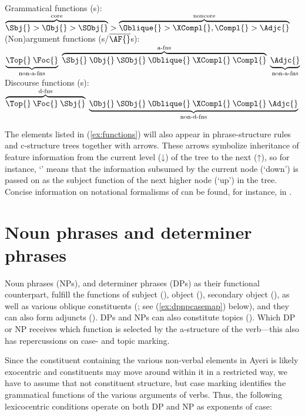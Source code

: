\pex\label{ex:functions}
\a\label{ex:gfs} Grammatical functions (\GF{}s):\\
	$\overbrace{\Sbj{} > \Obj{} > \SObj{}}^{\text{core}} > 
	\overbrace{\Oblique{} > \XCompl{}, \Compl{} > \Adjc{}}^{\text{noncore}}$
\a\label{ex:nonafs} (Non)argument functions (\AF{}s/$\overline{\mbox{\AF{}}%
}$s):\\
	$\underbrace{\Top{}\: \Foc{}}_{\text{non-a-fns}}\; 
	\overbrace{\Sbj{}\: \Obj{}\: \SObj{}\: \Oblique{}\: \XCompl{}\: 
		\Compl{}}^{\text{a-fns}}\; 
	\underbrace{\Adjc{}}_{\text{non-a-fns}}$
\a\label{ex:dfs} Discourse functions (\DF{}s):\\
	$\overbrace{\Top{}\: \Foc{}\: \Sbj{}}^{\text{d-fns}}\;  
	\underbrace{\Obj{}\: \SObj{}\: \Oblique{}\: \XCompl{}\: \Compl{}\: 
		\Adjc{}}_{\text{non-d-fns}}$
\xe

The elements listed in (\ref{ex:functions}) will also appear in
phrase-structure rules and c-structure trees together with arrows. These arrows
symbolize inheritance of feature information from the current level (↓) of the
tree to the next (↑), so for instance, `\pass{\Sbj}' means that the information
subsumed by the current node (`down') is passed on as the subject function of
the next higher node (`up') in the tree. Concise information on notational
formalisms of \Lfg{} can be found, for instance, in \citet{buttking2015}.

\section{Noun phrases and determiner phrases}
\label{sec:nps-dps}

Noun phrases (NPs), and determiner phrases (DPs) as their functional 
counterpart, fulfill the functions of subject (\Sbj{}), object (\Obj{}), 
secondary object (\SObj{}), as well as various oblique constituents (\Oblique;
see (\ref{ex:dpnpcasemap}) below), and they can also form adjuncts (\Adjc{}).
DPs and NPs can also constitute topics (\Top{}). Which DP or NP receives which 
function is selected by the a-structure of the verb---this also has 
repercussions on case- and topic marking.

Since the constituent containing the various non-verbal elements in Ayeri is 
likely exocentric and constituents may move around within it in a restricted 
way, we have to assume that not constituent structure, but case marking 
identifies the grammatical functions of the various arguments of verbs. Thus, 
the following lexicocentric conditions operate on both DP and NP as exponents 
of case:

